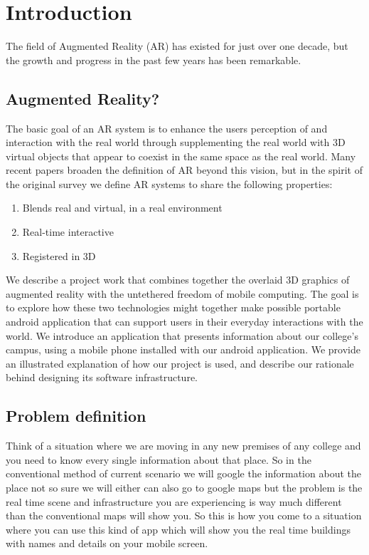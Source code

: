 \documentclass{article}
\begin{document}
\section{Introduction}
\par The field of Augmented Reality (AR) has existed for just over one decade, but the growth and progress in the past few years has been remarkable. 
\subsection{Augmented Reality?}
\par The basic goal of an AR system is to enhance the users perception of and interaction with the real world through supplementing the real world with 3D virtual objects that appear to coexist in the same space as the real world.  Many recent papers broaden the definition of AR beyond this vision, but in the spirit of the original survey we define AR systems to share the following properties: 

\begin{enumerate}
\item  Blends real and virtual, in a real environment 
\item  Real-time interactive 
\item  Registered in 3D 
\end{enumerate}

\par We describe a project work that combines together the overlaid 3D graphics of augmented reality with the untethered freedom of mobile computing. The goal is to explore how these two technologies might together make possible portable android application that can support users in their everyday interactions with the world. We introduce an application that presents information about our college’s campus, using a mobile phone installed with our android application. We provide an illustrated explanation of how our project is used, and describe our rationale behind designing its software infrastructure. \\


\subsection{Problem definition}
\par Think of a situation where we are moving in any new premises of any college and you need to know every single information about that place. So in the conventional method of current scenario we will google the information about the place not so sure we will either can also go to google maps but the problem is the real time scene and infrastructure you are experiencing is way much different than the conventional maps will show you. So this is how you come to a situation where you can use this kind of app which will show you the real time buildings with names and details on your mobile screen.
\end{document}

